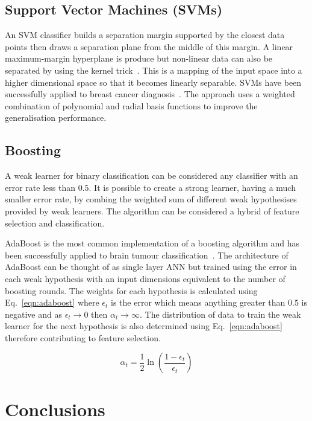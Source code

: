\documentclass[journal]{IEEEtran}
\begin{document}
\subsection{Support Vector Machines (SVMs)}
An SVM classifier builds a separation margin supported by the closest data points then draws a separation plane from the middle of this margin.
A linear maximum-margin hyperplane is produce but non-linear data can also be separated by using the kernel trick~\cite{cortes95support}. 
This is a mapping of the input space into a higher dimensional space so that it becomes linearly separable.
SVMs have been successfully applied to breast cancer diagnosis~\cite{xiufeng13svm}.
The approach uses a weighted combination of polynomial and radial basis functions to improve the generalisation performance.



\subsection{Boosting}
A weak learner for binary classification can be considered any classifier with an error rate less than $0.5$.
It is possible to create a strong learner, having a much smaller error rate, by combing the weighted sum of different weak hypothesises provided by weak learners. 
The algorithm can be considered a hybrid of feature selection and classification.

AdaBoost is the most common implementation of a boosting algorithm and has been successfully applied to brain tumour classification~\cite{freund99boost,islam13multi}.
The architecture of AdaBoost can be thought of as single layer ANN but trained using the error in each weak hypothesis with an input dimensions equivalent to the number of boosting rounds.
The weights for each hypothesis is calculated using Eq.~\eqref{eqn:adaboost} where $\epsilon_t$ is the error which means anything greater than $0.5$ is negative and as $\epsilon_t \to 0$ then $\alpha_t \to \infty$.
The distribution of data to train the weak learner for the next hypothesis is also determined using Eq.~\eqref{eqn:adaboost} therefore contributing to feature selection.


\begin{equation}
	\alpha_t = \frac{1}{2}\ln\left(\frac{1 - \epsilon_t}{\epsilon_t}\right)
	\label{eqn:adaboost}
\end{equation}






\section{Conclusions}
\label{sec:conclusions}
\end{document}
